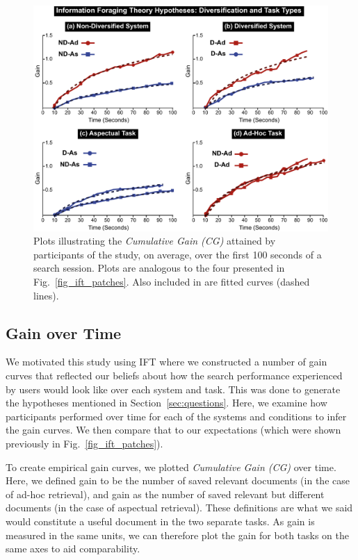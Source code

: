 \begin{figure}[t!]
\includegraphics[width=\textwidth]{figures/cg-fromthesis.pdf}
\caption{Plots illustrating the \emph{Cumulative Gain (CG)} attained by participants of the study, on average, over the first 100 seconds of a search session. Plots are analogous to the four presented in Fig.~\ref{fig_ift_patches}. Also included in are fitted curves (dashed lines).} \label{fig_cg}
\end{figure}

\subsection{Gain over Time}
We motivated this study using IFT where we constructed a number of gain curves that reflected our beliefs about how the search performance experienced by users would look like over each system and task. This was done to generate the hypotheses mentioned in Section~\ref{sec:questions}. Here, we examine how participants performed over time for each of the systems and conditions to infer the gain curves. We then compare that to our expectations (which were shown previously in Fig.~\ref{fig_ift_patches}).

To create empirical gain curves, we plotted \emph{Cumulative Gain (CG)} over time. Here, we defined gain to be the number of saved relevant documents (in the case of ad-hoc retrieval), and gain as the number of saved relevant but different documents (in the case of aspectual retrieval). These definitions are what we said would constitute a useful document in the two separate tasks. As gain is measured in the same units, we can therefore plot the gain for both tasks on the same axes to aid comparability.

